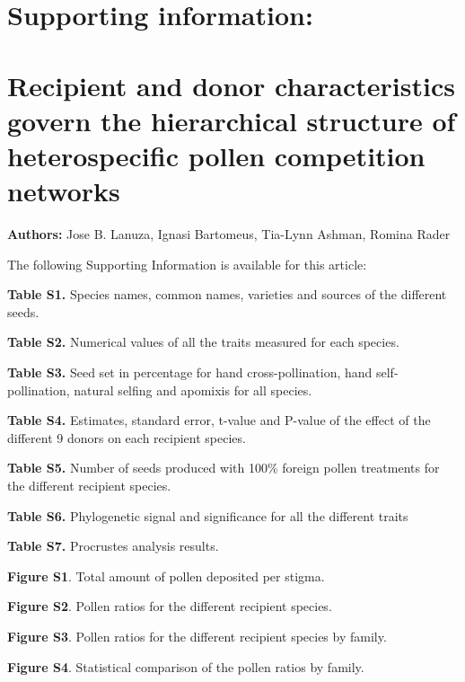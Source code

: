 \documentclass[
  12pt,
]{article}
\author{}
\date{\vspace{-2.5em}}
\begin{document}
\captionsetup[figure]{labelformat=empty}
\captionsetup[table]{labelformat=empty}
\renewcommand{\figurename}{}

\hypertarget{supporting-information}{%
\section{Supporting information:}\label{supporting-information}}

\hypertarget{recipient-and-donor-characteristics-govern-the-hierarchical-structure-of-heterospecific-pollen-competition-networks}{%
\section{Recipient and donor characteristics govern the hierarchical
structure of heterospecific pollen competition
networks}\label{recipient-and-donor-characteristics-govern-the-hierarchical-structure-of-heterospecific-pollen-competition-networks}}

\textbf{Authors:} Jose B. Lanuza, Ignasi Bartomeus, Tia-Lynn Ashman,
Romina Rader

The following Supporting Information is available for this article:

\textbf{Table S1.} Species names, common names, varieties and sources of
the different seeds.

\textbf{Table S2.} Numerical values of all the traits measured for each
species.

\textbf{Table S3.} Seed set in percentage for hand cross-pollination,
hand self-pollination, natural selfing and apomixis for all species.

\textbf{Table S4.} Estimates, standard error, t-value and P-value of the
effect of the different 9 donors on each recipient species.

\textbf{Table S5.} Number of seeds produced with 100\% foreign pollen
treatments for the different recipient species.

\textbf{Table S6.} Phylogenetic signal and significance for all the
different traits

\textbf{Table S7.} Procrustes analysis results.

\textbf{Figure S1}. Total amount of pollen deposited per stigma.

\textbf{Figure S2}. Pollen ratios for the different recipient species.

\textbf{Figure S3}. Pollen ratios for the different recipient species by
family.

\textbf{Figure S4}. Statistical comparison of the pollen ratios by
family.
\end{document}
